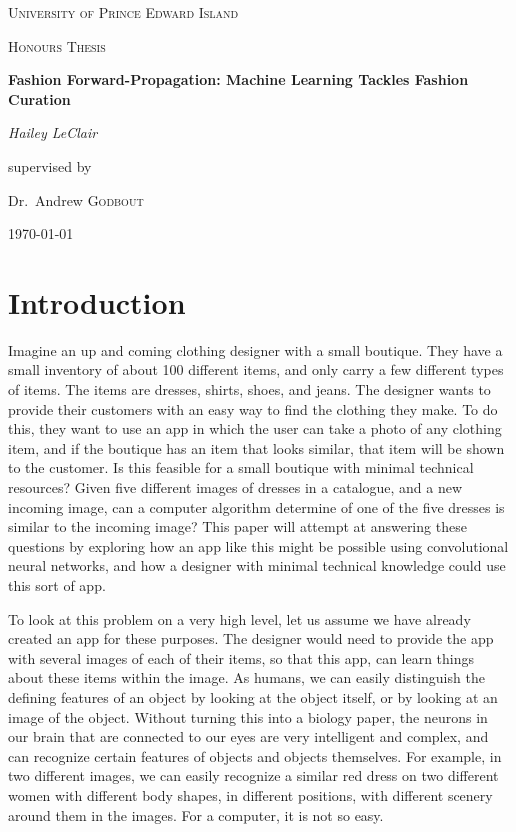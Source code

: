\documentclass[12pt]{report} %
\begin{document}
\begin{titlepage} 
\centering
    {\scshape\LARGE University of Prince Edward Island\par}
    \vspace{1cm}
    {\scshape\Large Honours Thesis\par}
    \vspace{1.5cm}
    {\huge\bfseries Fashion Forward-Propagation: Machine Learning Tackles Fashion Curation\par}
    \vspace{2cm}
    {\Large\itshape Hailey LeClair\par}
    \vfill
    supervised by\par
    Dr.~Andrew \textsc{Godbout}

\vfill

\today\par

\end{titlepage}
\tableofcontents
\newpage
\listoffigures
\newpage


\chapter{Introduction}
	Imagine an up and coming clothing designer with a small boutique. They have a small inventory of about 100 different items, and only carry a few different types of items. The items are dresses, shirts, shoes, and jeans. The designer wants to provide their customers with an easy way to find the clothing they make. To do this, they want to use an app in which the user can take a photo of any clothing item, and if the boutique has an item that looks similar, that item will be shown to the customer. Is this feasible for a small boutique with minimal technical resources? Given five different images of dresses in a catalogue, and a new incoming image, can a computer algorithm determine of one of the five dresses is similar to the incoming image? This paper will attempt at answering these questions by exploring how an app like this might be possible using convolutional neural networks, and how a designer with minimal technical knowledge could use this sort of app.
	
	To look at this problem on a very high level, let us assume we have already created an app for these purposes. The designer would need to provide the app with several images of each of their items, so that this app, can learn things about these items within the image. As humans, we can easily distinguish the defining features of an object by looking at the object itself, or by looking at an image of the object. Without turning this into a biology paper, the neurons in our brain that are connected to our eyes are very intelligent and complex, and can recognize certain features of objects and objects themselves\cite{aurelienMachineLearning}. For example, in two different images, we can easily recognize a similar red dress on two different women with different body shapes, in different positions, with different scenery around them in the images. For a computer, it is not so easy. 
	
\end{document}
